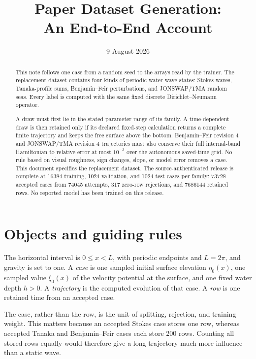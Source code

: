 \documentclass[10pt]{article}
\title{Paper Dataset Generation:\\
An End-to-End Account}
\author{}
\date{9 August 2026}
\begin{document}
\maketitle

\begin{abstract}
This note follows one case from a random seed to the arrays read by the
trainer.  The replacement dataset contains four kinds of periodic water-wave
states: Stokes waves, Tanaka-profile sums, Benjamin--Feir perturbations, and
JONSWAP/TMA random seas.  Every label is computed with the same fixed
discrete Dirichlet--Neumann operator.

A draw must first lie in the stated parameter range of its family.  A
time-dependent draw is then retained only if its declared fixed-step
calculation returns a complete finite trajectory and keeps the free surface
above the bottom.  Benjamin--Feir revision 4 and JONSWAP/TMA revision 4 trajectories
must also conserve their full internal-band Hamiltonian to relative error at
most \(10^{-3}\) over the autonomous saved-time grid.  No rule based on visual
roughness, sign changes, slope, or model error removes a case.  This document
specifies the replacement dataset.  The source-authenticated release is
complete at 16384 training, 1024 validation, and 1024 test cases per family:
73728 accepted cases from 74045 attempts, 317 zero-row rejections, and
7686144 retained rows.  No reported model has been trained on this release.
\end{abstract}

\section{Objects and guiding rules}

The horizontal interval is $0\leq x<L$, with periodic endpoints and
$L=2\pi$, and gravity is set to one.  A \emph{case} is one sampled initial
surface elevation $\eta_0(x)$, one sampled value $\xi_0(x)$ of the velocity
potential at the surface, and one fixed water depth $h>0$.  A
\emph{trajectory} is the computed evolution of that case.  A \emph{row} is
one retained time from an accepted case.

The case, rather than the row, is the unit of splitting, rejection, and
training weight.  This matters because an accepted Stokes case stores one
row, whereas accepted Tanaka and Benjamin--Feir cases each store 200 rows.
Counting all stored rows equally would therefore give a long trajectory much
more influence than a static wave.
\end{document}
